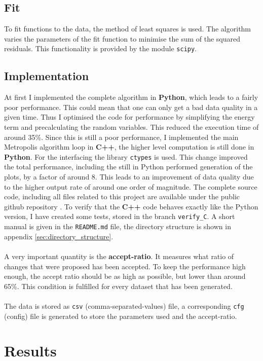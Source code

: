 \documentclass{scrartcl}
\begin{document}
	\subsection{Fit}
		To fit functions to the data, the method of least squares is used.
		The algorithm varies the parameters of the fit function to minimise the sum of the squared residuals.
		This functionality is provided by the module \verb!scipy!.

	\subsection{Implementation}
		At first I implemented the complete algorithm in \textbf{Python}, which leads to a fairly poor performance.
		This could mean that one can only get a bad data quality in a given time.
		Thus I optimised the code for performance by simplifying the energy term and precalculating the random variables.
		This reduced the execution time of around 35\%.
		Since this is still a poor performance, I implemented the main Metropolis algorithm loop in \textbf{C++}, the higher level computation is still done in \textbf{Python}.
		For the interfacing the library \verb!ctypes! is used.
		This change improved the total performance, including the still in Python performed generation of the plots, by a factor of around 8.
		This leads to an improvement of data quality due to the higher output rate of around one order of magnitude.
		The complete source code, including all files related to this project are available under the public github repository \cite{github}.
		To verify that the \textbf{C++} code behaves exactly like the Python version, I have created some tests, stored in the branch \verb!verify_C!.
		A short manual is given in the \verb!README.md! file, the directory structure is shown in appendix \ref{sec:directory_structure}.
		\\\\
		A very important quantity is the \textbf{accept-ratio}.
		It measures what ratio of changes that were proposed has been accepted.
		To keep the performance high enough, the accept ratio should be as high as possible, but lower than around 65\%.
		This condition is fulfilled for every dataset that has been generated.
		\\\\
		The data is stored as \verb!csv! (comma-separated-values) file, a corresponding \verb!cfg! (config) file is generated to store the parameters used and the accept-ratio.

	\section{Results}
\end{document}
